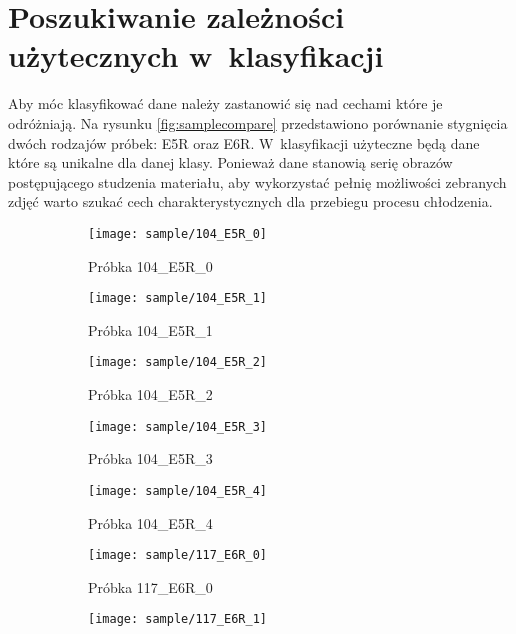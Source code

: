 \section{Poszukiwanie zależności użytecznych w~klasyfikacji}
Aby móc klasyfikować dane należy zastanowić się nad cechami które je
odróżniają.
Na rysunku \ref{fig:samplecompare} przedstawiono porównanie stygnięcia
dwóch rodzajów próbek: E5R oraz E6R.
W~klasyfikacji użyteczne będą dane które są unikalne dla danej klasy.
Ponieważ dane stanowią serię obrazów postępującego studzenia materiału, aby
wykorzystać pełnię możliwości zebranych zdjęć warto szukać cech
charakterystycznych dla przebiegu procesu chłodzenia.
\begin{figure}[htbp]
	\centering
	\begin{subfigure}{0.3\textwidth}
		\centering
		\texttt{[image: sample/104\_E5R\_0]}
		\caption{Próbka 104\_E5R\_0}
	\end{subfigure}
	\hspace{0.25cm}
	\vspace{0.5cm}
	\begin{subfigure}{0.3\textwidth}
		\centering
		\texttt{[image: sample/104\_E5R\_1]}
		\caption{Próbka 104\_E5R\_1}
	\end{subfigure}
	\hspace{0.25cm}
	\begin{subfigure}{0.3\textwidth}
		\centering
		\texttt{[image: sample/104\_E5R\_2]}
		\caption{Próbka 104\_E5R\_2}
	\end{subfigure}
	\begin{subfigure}{0.3\textwidth}
		\centering
		\texttt{[image: sample/104\_E5R\_3]}
		\caption{Próbka 104\_E5R\_3}
	\end{subfigure}
	\hspace{0.25cm}
	\vspace{0.5cm}
	\begin{subfigure}{0.3\textwidth}
		\centering
		\texttt{[image: sample/104\_E5R\_4]}
		\caption{Próbka 104\_E5R\_4}
	\end{subfigure}
	\hspace{0.25cm}
	\begin{subfigure}{0.3\textwidth}
		\centering
		\texttt{[image: sample/117\_E6R\_0]}
		\caption{Próbka 117\_E6R\_0}
	\end{subfigure}
	\begin{subfigure}{0.3\textwidth}
		\centering
		\texttt{[image: sample/117\_E6R\_1]}

\end{subfigure}
\end{figure}
